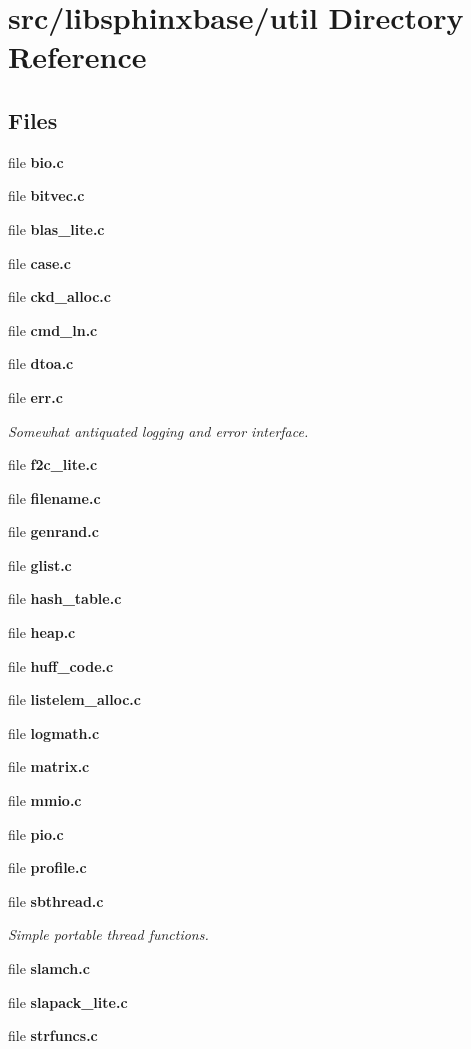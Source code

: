 \section{src/libsphinxbase/util Directory Reference}
\label{dir_dc1f04dceb148346198172cb52290701}
\subsection*{Files}
\begin{DoxyCompactItemize}
\item 
file {\bfseries bio.\-c}
\item 
file {\bfseries bitvec.\-c}
\item 
file {\bfseries blas\-\_\-lite.\-c}
\item 
file {\bfseries case.\-c}
\item 
file {\bfseries ckd\-\_\-alloc.\-c}
\item 
file {\bfseries cmd\-\_\-ln.\-c}
\item 
file {\bfseries dtoa.\-c}
\item 
file {\bf err.\-c}
\begin{DoxyCompactList}\small\item\em Somewhat antiquated logging and error interface. \end{DoxyCompactList}\item 
file {\bfseries f2c\-\_\-lite.\-c}
\item 
file {\bfseries filename.\-c}
\item 
file {\bfseries genrand.\-c}
\item 
file {\bfseries glist.\-c}
\item 
file {\bfseries hash\-\_\-table.\-c}
\item 
file {\bfseries heap.\-c}
\item 
file {\bfseries huff\-\_\-code.\-c}
\item 
file {\bfseries listelem\-\_\-alloc.\-c}
\item 
file {\bfseries logmath.\-c}
\item 
file {\bfseries matrix.\-c}
\item 
file {\bfseries mmio.\-c}
\item 
file {\bfseries pio.\-c}
\item 
file {\bfseries profile.\-c}
\item 
file {\bf sbthread.\-c}
\begin{DoxyCompactList}\small\item\em Simple portable thread functions. \end{DoxyCompactList}\item 
file {\bfseries slamch.\-c}
\item 
file {\bfseries slapack\-\_\-lite.\-c}
\item 
file {\bfseries strfuncs.\-c}
\end{DoxyCompactItemize}

